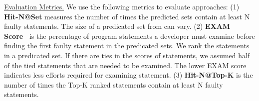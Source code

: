 \underline{Evaluation Metrics.}  
We use the following metrics to evaluate approaches: 
(1) {\bf Hit-N@Set} measures the number of times the predicted sets contain at least N faulty statements. %
The size of a predicated set from {\tool} can vary. %
(2) {\bf EXAM Score~\cite{wong2008crosstab}} is the percentage of program statements a developer must examine before finding the first faulty statement in the predicated sets. We rank the statements in a predicated set. If there are ties in the scores of statements, we assumed half of the tied statements that are needed to be examined. The lower EXAM score indicates less efforts required for examining statement.
(3) {\bf Hit-N@Top-K} is the number of times the Top-K ranked statements contain at least N faulty statements. %




